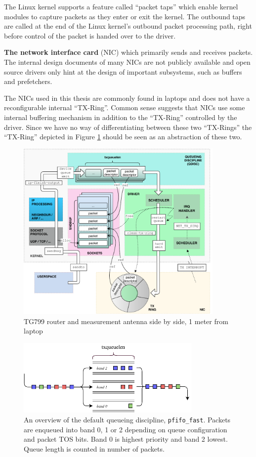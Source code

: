 The Linux kernel supports a feature called ``packet taps'' which enable
kernel modules to capture packets as they enter or exit the kernel. The
outbound taps are called  at the end of the Linux kernel's outbound packet
processing path, right before control of  the packet is handed over to the
driver. 

\textbf{The network interface card} (NIC) which primarily sends and
receives packets.  The internal design documents of many NICs are not publicly
available and open source drivers only hint at the design of important
subsystems, such as buffers and prefetchers. 

The NICs used in this thesis are commonly found in laptops and does not
have a reconfigurable internal ``TX-Ring''. Common sense suggests that
NICs use some internal buffering mechanism in addition to the ``TX-Ring''
controlled by the driver. Since we have no way of differentiating between
these two ``TX-Rings'' the ``TX-Ring'' depicted in Figure
\ref{fig:linux_egress} should be seen as an abstraction of these two.


\begin{figure}
\center
\includegraphics[width=0.9\textwidth]{images/linux-egress-overview.pdf}
\caption{TG799 router and measurement antenna side by side, 1 meter from laptop}
\label{fig:linux_egress}
\end{figure}

\begin{figure}
\center
\includegraphics[width=0.8\textwidth]{images/pfifo-fast-queue.pdf}
\caption{An overview of the default queueing discipline, \texttt{pfifo\_fast}. Packets are enqueued into band 0, 1 or 2 depending on queue configuration and packet TOS bits. Band 0 is highest priority and band 2 lowest. Queue length is counted in number of packets.}
\label{fig:pfifofast}
\end{figure}

